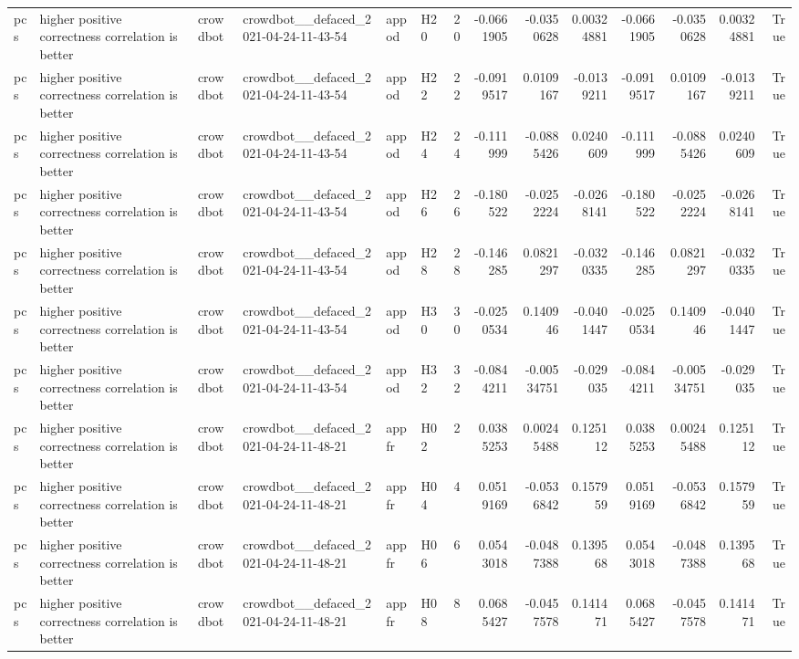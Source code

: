\begin{longtable}{llllllrrrrrrrr}
pcs & higher positive correctness correlation is better & crowdbot & crowdbot\_\_defaced\_2021-04-24-11-43-54 & appod & H20 & 20 & -0.0661905 & -0.0350628 & 0.00324881 & -0.0661905 & -0.0350628 & 0.00324881 & True \\
pcs & higher positive correctness correlation is better & crowdbot & crowdbot\_\_defaced\_2021-04-24-11-43-54 & appod & H22 & 22 & -0.0919517 & 0.0109167 & -0.0139211 & -0.0919517 & 0.0109167 & -0.0139211 & True \\
pcs & higher positive correctness correlation is better & crowdbot & crowdbot\_\_defaced\_2021-04-24-11-43-54 & appod & H24 & 24 & -0.111999 & -0.0885426 & 0.0240609 & -0.111999 & -0.0885426 & 0.0240609 & True \\
pcs & higher positive correctness correlation is better & crowdbot & crowdbot\_\_defaced\_2021-04-24-11-43-54 & appod & H26 & 26 & -0.180522 & -0.0252224 & -0.0268141 & -0.180522 & -0.0252224 & -0.0268141 & True \\
pcs & higher positive correctness correlation is better & crowdbot & crowdbot\_\_defaced\_2021-04-24-11-43-54 & appod & H28 & 28 & -0.146285 & 0.0821297 & -0.0320335 & -0.146285 & 0.0821297 & -0.0320335 & True \\
pcs & higher positive correctness correlation is better & crowdbot & crowdbot\_\_defaced\_2021-04-24-11-43-54 & appod & H30 & 30 & -0.0250534 & 0.140946 & -0.0401447 & -0.0250534 & 0.140946 & -0.0401447 & True \\
pcs & higher positive correctness correlation is better & crowdbot & crowdbot\_\_defaced\_2021-04-24-11-43-54 & appod & H32 & 32 & -0.0844211 & -0.00534751 & -0.029035 & -0.0844211 & -0.00534751 & -0.029035 & True \\
pcs & higher positive correctness correlation is better & crowdbot & crowdbot\_\_defaced\_2021-04-24-11-48-21 & appfr & H02 & 2 & 0.0385253 & 0.00245488 & 0.125112 & 0.0385253 & 0.00245488 & 0.125112 & True \\
pcs & higher positive correctness correlation is better & crowdbot & crowdbot\_\_defaced\_2021-04-24-11-48-21 & appfr & H04 & 4 & 0.0519169 & -0.0536842 & 0.157959 & 0.0519169 & -0.0536842 & 0.157959 & True \\
pcs & higher positive correctness correlation is better & crowdbot & crowdbot\_\_defaced\_2021-04-24-11-48-21 & appfr & H06 & 6 & 0.0543018 & -0.0487388 & 0.139568 & 0.0543018 & -0.0487388 & 0.139568 & True \\
pcs & higher positive correctness correlation is better & crowdbot & crowdbot\_\_defaced\_2021-04-24-11-48-21 & appfr & H08 & 8 & 0.0685427 & -0.0457578 & 0.141471 & 0.0685427 & -0.0457578 & 0.141471 & True \\

\end{longtable}
